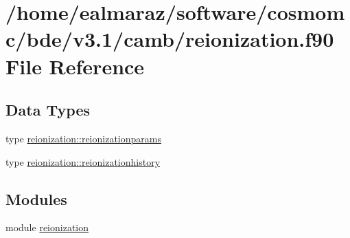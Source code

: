 \hypertarget{reionization_8f90}{}\section{/home/ealmaraz/software/cosmomc/bde/v3.1/camb/reionization.f90 File Reference}
\label{reionization_8f90}
\subsection*{Data Types}
\begin{DoxyCompactItemize}
\item 
type \mbox{\hyperlink{structreionization_1_1reionizationparams}{reionization\+::reionizationparams}}
\item 
type \mbox{\hyperlink{structreionization_1_1reionizationhistory}{reionization\+::reionizationhistory}}
\end{DoxyCompactItemize}
\subsection*{Modules}
\begin{DoxyCompactItemize}
\item 
module \mbox{\hyperlink{namespacereionization}{reionization}}
\end{DoxyCompactItemize}
